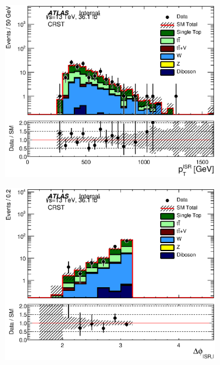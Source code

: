\begin{figure}[h!]
\begin{center}
\begin{subfigure}[b]{0.40\textwidth}
    	 \includegraphics[width=\textwidth]{figures/plotRegion/CA_PTISR_CRST_log.eps}
                \caption{ }
    \end{subfigure}
    \begin{subfigure}[b]{0.40\textwidth}    
    	 \includegraphics[width=\textwidth]{figures/plotRegion/CA_dphiISRI_CRST_log.eps}
                \caption{ }
    \end{subfigure}
    \begin{subfigure}[b]{0.40\textwidth}    

\end{subfigure}
\end{center}
\end{figure}

